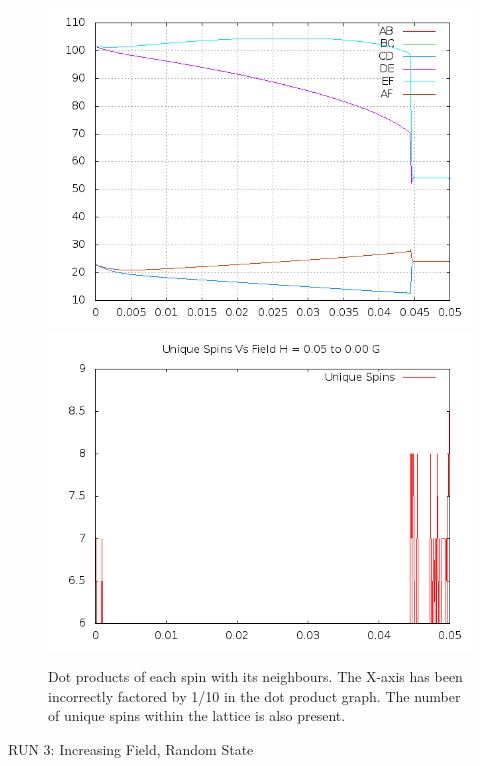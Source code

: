 \documentclass{article}
\begin{document}
\begin{figure}
\centering
\includegraphics[scale=0.5]{005to000dots.png}
\includegraphics[scale=0.5]{005to000Freq.png}
\caption{Dot products of each spin with its neighbours. The X-axis has been incorrectly factored
by 1/10 in the dot product graph. The number of unique spins within the lattice is also present.}
\end{figure}

\pagebreak 

\thispagestyle{plain}
\begin{center}
\LARGE
RUN 3: Increasing Field, Random State
\end{center}
\end{document}
